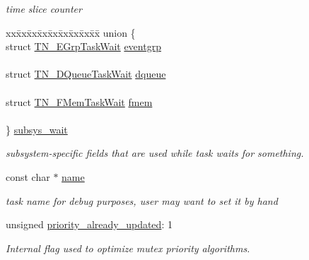 \begin{DoxyCompactItemize}
\begin{DoxyCompactList}\small\item\em time slice counter \end{DoxyCompactList}\item 
\begin{tabbing}
xx\=xx\=xx\=xx\=xx\=xx\=xx\=xx\=xx\=\kill
union \{\\
\>struct \hyperlink{structTN__EGrpTaskWait}{TN\_EGrpTaskWait} \hyperlink{structTN__Task_a22c8cfe2e95d6f891aa568cafdb95936}{eventgrp}\\
\>\\
\>struct \hyperlink{structTN__DQueueTaskWait}{TN\_DQueueTaskWait} \hyperlink{structTN__Task_aa536e1eba96904c006d1e61efc520378}{dqueue}\\
\>\\
\>struct \hyperlink{structTN__FMemTaskWait}{TN\_FMemTaskWait} \hyperlink{structTN__Task_a31921e5384127319bffd5ae09debac1e}{fmem}\\
\>\\
\} \hyperlink{structTN__Task_a7b1e431e2e2c65d8de74d48b44cf68ee}{subsys\_wait}\\

\end{tabbing}\begin{DoxyCompactList}\small\item\em subsystem-\/specific fields that are used while task waits for something. \end{DoxyCompactList}\item 
\hypertarget{structTN__Task_aed03c90906ffe2dcbcc49d8badc74147}{const char $\ast$ \hyperlink{structTN__Task_aed03c90906ffe2dcbcc49d8badc74147}{name}}\label{structTN__Task_aed03c90906ffe2dcbcc49d8badc74147}

\begin{DoxyCompactList}\small\item\em task name for debug purposes, user may want to set it by hand \end{DoxyCompactList}\item 
unsigned \hyperlink{structTN__Task_abb4d22974c7317dd610f646b9048656d}{priority\+\_\+already\+\_\+updated}\+: 1
\begin{DoxyCompactList}\small\item\em Internal flag used to optimize mutex priority algorithms. \end{DoxyCompactList}\end{DoxyCompactItemize}


